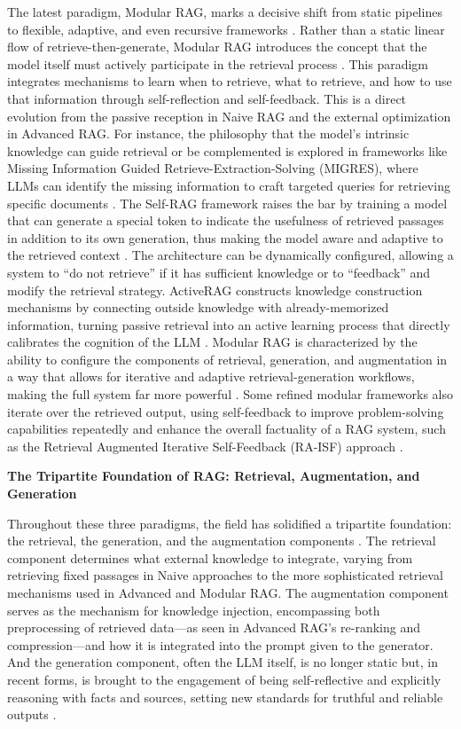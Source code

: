 \documentclass[11pt]{article}
\begin{document}
The latest paradigm, Modular RAG, marks a decisive shift from static pipelines to flexible, adaptive, and even recursive frameworks \cite{ref23}. Rather than a static linear flow of retrieve-then-generate, Modular RAG introduces the concept that the model itself must actively participate in the retrieval process \cite{ref36}. This paradigm integrates mechanisms to learn when to retrieve, what to retrieve, and how to use that information through self-reflection and self-feedback. This is a direct evolution from the passive reception in Naive RAG and the external optimization in Advanced RAG. For instance, the philosophy that the model's intrinsic knowledge can guide retrieval or be complemented is explored in frameworks like Missing Information Guided Retrieve-Extraction-Solving (MIGRES), where LLMs can identify the missing information to craft targeted queries for retrieving specific documents \cite{ref39}. The Self-RAG framework raises the bar by training a model that can generate a special token to indicate the usefulness of retrieved passages in addition to its own generation, thus making the model aware and adaptive to the retrieved context \cite{ref41}. The architecture can be dynamically configured, allowing a system to ``do not retrieve'' if it has sufficient knowledge or to ``feedback'' and modify the retrieval strategy. ActiveRAG constructs knowledge construction mechanisms by connecting outside knowledge with already-memorized information, turning passive retrieval into an active learning process that directly calibrates the cognition of the LLM \cite{ref36}. Modular RAG is characterized by the ability to configure the components of retrieval, generation, and augmentation in a way that allows for iterative and adaptive retrieval-generation workflows, making the full system far more powerful \cite{ref23}. Some refined modular frameworks also iterate over the retrieved output, using self-feedback to improve problem-solving capabilities repeatedly and enhance the overall factuality of a RAG system, such as the Retrieval Augmented Iterative Self-Feedback (RA-ISF) approach \cite{ref42}.

\textbf{The Tripartite Foundation of RAG: Retrieval, Augmentation, and Generation}

Throughout these three paradigms, the field has solidified a tripartite foundation: the retrieval, the generation, and the augmentation components \cite{ref23}. The retrieval component determines what external knowledge to integrate, varying from retrieving fixed passages in Naive approaches to the more sophisticated retrieval mechanisms used in Advanced and Modular RAG. The augmentation component serves as the mechanism for knowledge injection, encompassing both preprocessing of retrieved data---as seen in Advanced RAG's re-ranking and compression---and how it is integrated into the prompt given to the generator. And the generation component, often the LLM itself, is no longer static but, in recent forms, is brought to the engagement of being self-reflective and explicitly reasoning with facts and sources, setting new standards for truthful and reliable outputs \cite{ref41}.
\end{document}
